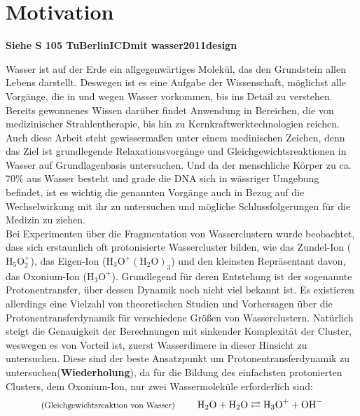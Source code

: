 
  \chapter{Motivation} \label{sec:Motivation}
  
  \textbf{Siehe S 105 TuBerlinICDmit wasser2011design}
  
  Wasser ist auf der Erde ein allgegenwärtiges Molekül, das den Grundstein allen Lebens darstellt. Deswegen ist es eine Aufgabe der Wissenschaft, möglichst alle Vorgänge, die in und wegen Wasser vorkommen, bis ins Detail zu verstehen. Bereits gewonnenes Wissen darüber findet Anwendung in Bereichen, die von medizinischer Strahlentherapie, bis hin zu Kernkraftwerktechnologien reichen. 
  Auch diese Arbeit steht gewissermaßen unter einem medinischen Zeichen, denn das Ziel ist grundlegende Relaxationsvorgänge und Gleichgewichtsreaktionen in Wasser auf Grundlagenbasis untersuchen. Und da der menschliche Körper zu ca. 70\% aus Wasser besteht und grade die DNA sich in wässriger Umgebung befindet, ist es wichtig die genannten Vorgänge auch in Bezug auf die Wechselwirkung mit ihr zu untersuchen und mögliche Schlussfolgerungen für die Medizin zu ziehen.\\
  Bei Experimenten über die Fragmentation von Wasserclustern wurde beobachtet, dass sich erstaunlich oft protonisierte Wassercluster bilden, wie das Zundel-Ion ($\mathrm{H_5O_2^+}$), das Eigen-Ion ($\mathrm{H_3O^+(H_2O)_3}$) und den kleinsten Repräsentant davon, das Oxonium-Ion ($\mathrm{H_3O^+}$). Grundlegend für deren Entstehung ist der sogenannte Protonentransfer, über dessen Dynamik noch nicht viel bekannt ist. Es existieren allerdings eine Vielzahl von theoretischen Studien und Vorhersagen über die Protonentransferdynamik für verschiedene Größen von Wasserclustern. Natürlich steigt die Genauigkeit der Berechnungen mit sinkender Komplexität der Cluster, weswegen es von Vorteil ist, zuerst Wasserdimere in dieser Hinsicht zu untersuchen. Diese sind der beste Ansatzpunkt um Protonentransferdynamik zu untersuchen(\textbf{Wiederholung}), da für die Bildung des einfachsten protonierten Clusters, dem Oxonium-Ion, nur zwei Wassermoleküle erforderlich sind:
  \begin{equation}
  \textmd{{\footnotesize(Gleichgewichtsreaktion von Wasser) }}\qquad \textmd{H}_2\textmd{O} + \textmd{H}_2\textmd{O} \rightleftarrows \textmd{H}_3\textmd{O}^+ + \textmd{O}\textmd{H}^- 
  \end{equation} 
  
